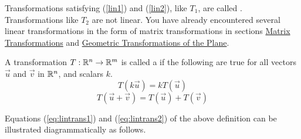 \documentclass{ximera}
\begin{document}
Transformations satisfying (\ref{lin1}) and (\ref{lin2}), like $T_1$, are called . Transformations like $T_2$ are not linear.
 You have already encountered several linear transformations in the form of matrix transformations in sections \href{https://ximera.osu.edu/linearalgebradzv3/LinearAlgebraInteractiveIntro/LTR-0005/main}{Matrix Transformations} and \href{https://ximera.osu.edu/linearalgebradzv3/LinearAlgebraInteractiveIntro/LTR-0070/main}{Geometric Transformations of the Plane}.  

  \begin{definition} \label{def:lin}
 A transformation $T:\mathbb{R}^n\rightarrow \mathbb{R}^m$ is called a  if the following are true for all vectors $\vec{u}$ and $\vec{v}$ in $\mathbb{R}^n$, and scalars $k$.
\begin{equation}\label{eq:lintrans1}
T(k\vec{u})= kT(\vec{u})
\end{equation}
\begin{equation}\label{eq:lintrans2}
T(\vec{u}+\vec{v})= T(\vec{u})+T(\vec{v})
\end{equation}
\end{definition}

Equations (\ref{eq:lintrans1}) and (\ref{eq:lintrans2}) of the above definition can be illustrated diagrammatically as follows.

\begin{center}
\end{center}
\end{document}
